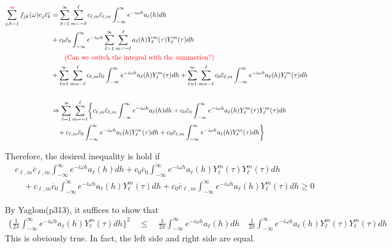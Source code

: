 \documentclass[11pt]{article}
\begin{document}
\begin{itemize}
\begin{align*}
\sum_{j,k=1}^{{\color{red}\infty}} f_{jk}(\omega) c_j \overline{c_k} &= \sum_{\ell=1}^\infty \sum_{m=-\ell}^{\ell} c_{\ell,m} \overline{c}_{\ell,m} \int_{-\infty}^{\infty} e^{-i \omega h}a_\ell(h) dh\\ 
&+ c_{0} \overline{c}_{0} \int_{-\infty}^{\infty} e^{-i \omega h} \sum_{\ell=1}^\infty \sum_{m=-\ell}^{\ell} a_\ell(h) Y_{\ell}^m(\tau) Y_{\ell}^m(\tau) dh\\ 
&\quad \quad \text{{\color{red}(Can we switch the integral with the summation?)}}\\
&+ \sum_{\ell=1}^\infty \sum_{m=-\ell}^{\ell} c_{\ell,m} \overline{c}_{0} \int_{-\infty}^{\infty} e^{-i \omega h}a_\ell(h) Y_{\ell}^m(\tau) dh + \sum_{\ell=1}^\infty \sum_{m=-\ell}^{\ell} c_{0} \overline{c}_{\ell,m} \int_{-\infty}^{\infty} e^{-i \omega h}a_\ell(h) Y_{\ell}^m(\tau) dh\\
\\
&\Rightarrow \sum_{\ell=1}^\infty \sum_{m=-\ell}^{\ell} \biggl\{ c_{\ell,m} \overline{c}_{\ell,m} \int_{-\infty}^{\infty} e^{-i \omega h}a_\ell(h) dh + c_{0} \overline{c}_{0} \int_{-\infty}^{\infty} e^{-i \omega h} a_\ell(h) Y_{\ell}^m(\tau) Y_{\ell}^m(\tau) dh\\
&\quad + c_{\ell,m} \overline{c}_{0} \int_{-\infty}^{\infty} e^{-i \omega h}a_\ell(h) Y_{\ell}^m(\tau) dh + c_{0} \overline{c}_{\ell,m} \int_{-\infty}^{\infty} e^{-i \omega h}a_\ell(h) Y_{\ell}^m(\tau) dh \biggl\}\\
\end{align*}

Therefore, the desired inequality is hold if\\
\begin{align*}
&c_{\ell,m} \overline{c}_{\ell,m} \int_{-\infty}^{\infty} e^{-i \omega h}a_\ell(h) dh + c_{0} \overline{c}_{0} \int_{-\infty}^{\infty} e^{-i \omega h} a_\ell(h) Y_{\ell}^m(\tau) Y_{\ell}^m(\tau) dh\\
&\quad + c_{\ell,m} \overline{c}_{0} \int_{-\infty}^{\infty} e^{-i \omega h}a_\ell(h) Y_{\ell}^m(\tau) dh + c_{0} \overline{c}_{\ell,m} \int_{-\infty}^{\infty} e^{-i \omega h}a_\ell(h) Y_{\ell}^m(\tau) dh \ge 0
\end{align*}

By Yaglom(p313), it suffices to show that\\
\begin{align*}
\biggl\{ \frac{1}{2\pi} \int_{-\infty}^{\infty} e^{-i \omega h}a_\ell(h) Y_{\ell}^m(\tau) dh \biggl\}^2 \quad \le \quad \frac{1}{2\pi} \int_{-\infty}^{\infty} e^{-i \omega h}a_\ell(h) dh \quad \frac{1}{2\pi} \int_{-\infty}^{\infty} e^{-i \omega h}a_\ell(h) Y_{\ell}^m(\tau) Y_{\ell}^m(\tau) dh 
\end{align*}
This is obviously true. In fact, the left side and right side are equal.\\



\end{itemize}
\end{document}
